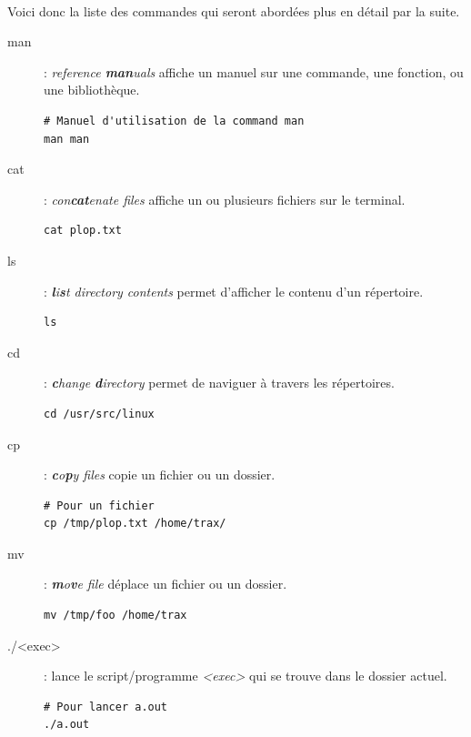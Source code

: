 \documentclass[french, a4paper, 12pt, titlepage]{article}
\begin{document}
\paragraph{} Voici donc la liste des commandes qui seront abordées plus en
détail par la suite.

\begin{description}
\item[man]: \emph{reference \textbf{man}uals} affiche un manuel sur une
	commande, une fonction, ou une bibliothèque.

  \begin{lstlisting}
# Manuel d'utilisation de la command man
man man
  \end{lstlisting}

\item[cat]: \emph{con\textbf{cat}enate files} affiche un ou plusieurs fichiers
	sur le terminal.

  \begin{lstlisting}
cat plop.txt
  \end{lstlisting}

\item[ls]: \emph{\textbf{l}i\textbf{s}t directory contents} permet d'afficher
	le contenu d'un répertoire.

  \begin{lstlisting}
ls
  \end{lstlisting}

\item[cd]: \emph{\textbf{c}hange \textbf{d}irectory} permet de naviguer à
	travers les répertoires.

  \begin{lstlisting}
cd /usr/src/linux
  \end{lstlisting}

\item[cp]: \emph{\textbf{c}o\textbf{p}y files} copie un fichier ou un dossier.

  \begin{lstlisting}
# Pour un fichier
cp /tmp/plop.txt /home/trax/
  \end{lstlisting}

\item[mv]: \emph{\textbf{m}o\textbf{v}e file} déplace un fichier ou un dossier.

  \begin{lstlisting}
mv /tmp/foo /home/trax
  \end{lstlisting}

\item[./<exec>]: lance le script/programme \emph{<exec>} qui se trouve dans le
	dossier actuel.

  \begin{lstlisting}
# Pour lancer a.out
./a.out
  \end{lstlisting}

\end{description}
\end{document}
